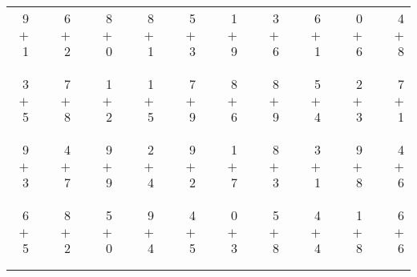 \documentclass[12pt, letterpaper]{article}
\begin{document}
\begin{tabular}{rrrrrrrrrrrrrrrrrrr}
9 & & 6 & & 8 & & 8 & & 5 & & 1 & & 3 & & 6 & & 0 & & 4\\
$+$ 1 & & $+$ 2 & & $+$ 0 & & $+$ 1 & & $+$ 3 & & $+$ 9 & & $+$ 6 & & $+$ 1 & & $+$ 6 & & $+$ 8\\
\cline{1-1} \cline{3-3} \cline{5-5} \cline{7-7} \cline{9-9} \cline{11-11} \cline{13-13} \cline{15-15} \cline{17-17} \cline{19-19} \\ \\
3 & & 7 & & 1 & & 1 & & 7 & & 8 & & 8 & & 5 & & 2 & & 7\\
$+$ 5 & & $+$ 8 & & $+$ 2 & & $+$ 5 & & $+$ 9 & & $+$ 6 & & $+$ 9 & & $+$ 4 & & $+$ 3 & & $+$ 1\\
\cline{1-1} \cline{3-3} \cline{5-5} \cline{7-7} \cline{9-9} \cline{11-11} \cline{13-13} \cline{15-15} \cline{17-17} \cline{19-19} \\ \\
9 & & 4 & & 9 & & 2 & & 9 & & 1 & & 8 & & 3 & & 9 & & 4\\
$+$ 3 & & $+$ 7 & & $+$ 9 & & $+$ 4 & & $+$ 2 & & $+$ 7 & & $+$ 3 & & $+$ 1 & & $+$ 8 & & $+$ 6\\
\cline{1-1} \cline{3-3} \cline{5-5} \cline{7-7} \cline{9-9} \cline{11-11} \cline{13-13} \cline{15-15} \cline{17-17} \cline{19-19} \\ \\
6 & & 8 & & 5 & & 9 & & 4 & & 0 & & 5 & & 4 & & 1 & & 6\\
$+$ 5 & & $+$ 2 & & $+$ 0 & & $+$ 4 & & $+$ 5 & & $+$ 3 & & $+$ 8 & & $+$ 4 & & $+$ 8 & & $+$ 6\\
\cline{1-1} \cline{3-3} \cline{5-5} \cline{7-7} \cline{9-9} \cline{11-11} \cline{13-13} \cline{15-15} \cline{17-17} \cline{19-19} \\ \\
\end{tabular}
\newpage
\end{document}
